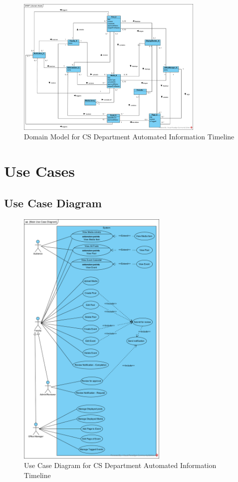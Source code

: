 \documentclass{article}
\begin{document}
\begin{figure}[H]
    \centering
    \includegraphics[width=0.8\textwidth]{images/DomainModel.png}
    \centering
    \caption{Domain Model for CS Department Automated Information Timeline}
\end{figure}
\section{Use Cases}
\subsection{Use Case Diagram}
\begin{figure}[H]
    \centering
    \includegraphics[width=0.64\textwidth]{images/UCD.png}
    \centering
    \caption{Use Case Diagram for CS Department Automated Information Timeline}
\end{figure}
\end{document}
